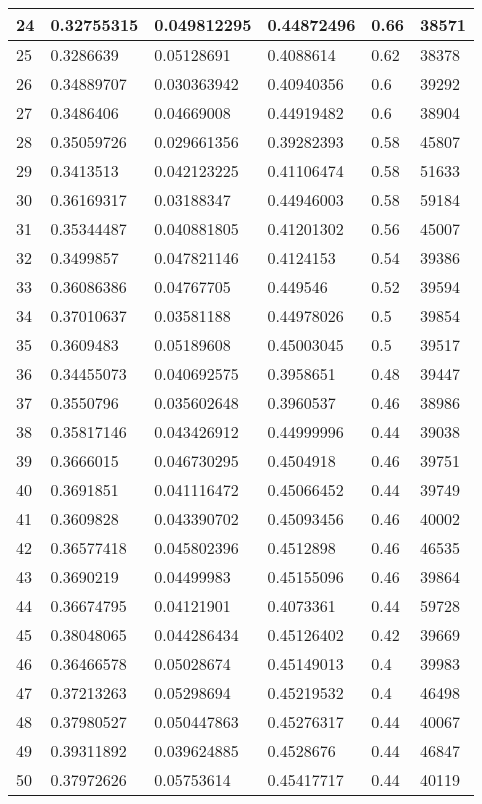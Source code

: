 \begin{longtable}{|l|l|l|l|l|l|}
24 & 0.32755315 & 0.049812295 & 0.44872496 & 0.66 & 38571 \\ \hline 
25 & 0.3286639 & 0.05128691 & 0.4088614 & 0.62 & 38378 \\ \hline 
26 & 0.34889707 & 0.030363942 & 0.40940356 & 0.6 & 39292 \\ \hline 
27 & 0.3486406 & 0.04669008 & 0.44919482 & 0.6 & 38904 \\ \hline 
28 & 0.35059726 & 0.029661356 & 0.39282393 & 0.58 & 45807 \\ \hline 
29 & 0.3413513 & 0.042123225 & 0.41106474 & 0.58 & 51633 \\ \hline 
30 & 0.36169317 & 0.03188347 & 0.44946003 & 0.58 & 59184 \\ \hline 
31 & 0.35344487 & 0.040881805 & 0.41201302 & 0.56 & 45007 \\ \hline 
32 & 0.3499857 & 0.047821146 & 0.4124153 & 0.54 & 39386 \\ \hline 
33 & 0.36086386 & 0.04767705 & 0.449546 & 0.52 & 39594 \\ \hline 
34 & 0.37010637 & 0.03581188 & 0.44978026 & 0.5 & 39854 \\ \hline 
35 & 0.3609483 & 0.05189608 & 0.45003045 & 0.5 & 39517 \\ \hline 
36 & 0.34455073 & 0.040692575 & 0.3958651 & 0.48 & 39447 \\ \hline 
37 & 0.3550796 & 0.035602648 & 0.3960537 & 0.46 & 38986 \\ \hline 
38 & 0.35817146 & 0.043426912 & 0.44999996 & 0.44 & 39038 \\ \hline 
39 & 0.3666015 & 0.046730295 & 0.4504918 & 0.46 & 39751 \\ \hline 
40 & 0.3691851 & 0.041116472 & 0.45066452 & 0.44 & 39749 \\ \hline 
41 & 0.3609828 & 0.043390702 & 0.45093456 & 0.46 & 40002 \\ \hline 
42 & 0.36577418 & 0.045802396 & 0.4512898 & 0.46 & 46535 \\ \hline 
43 & 0.3690219 & 0.04499983 & 0.45155096 & 0.46 & 39864 \\ \hline 
44 & 0.36674795 & 0.04121901 & 0.4073361 & 0.44 & 59728 \\ \hline 
45 & 0.38048065 & 0.044286434 & 0.45126402 & 0.42 & 39669 \\ \hline 
46 & 0.36466578 & 0.05028674 & 0.45149013 & 0.4 & 39983 \\ \hline 
47 & 0.37213263 & 0.05298694 & 0.45219532 & 0.4 & 46498 \\ \hline 
48 & 0.37980527 & 0.050447863 & 0.45276317 & 0.44 & 40067 \\ \hline 
49 & 0.39311892 & 0.039624885 & 0.4528676 & 0.44 & 46847 \\ \hline 
50 & 0.37972626 & 0.05753614 & 0.45417717 & 0.44 & 40119 \\ \hline 
\end{longtable}